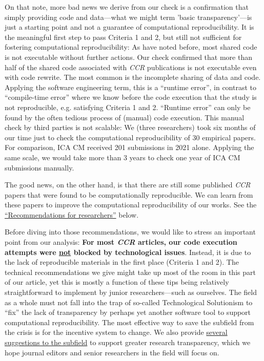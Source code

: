 On that note, more bad news we derive from our check is a confirmation that simply providing code and data---what we might term 'basic transparency'---is just a starting point and not a guarantee of computational reproducibility. It is the meaningful first step to pass Criteria 1 and 2, but still not sufficient for fostering computational reproducibility: As \textcite{cruewell:2023:WB,trisovic:2022} have noted before, most shared code is not executable without further actions. Our check confirmed that more than half of the shared code associated with \textit{CCR} publications is not executable even with code rewrite. The most common is the incomplete sharing of data and code. Applying the software engineering term, this is a ``runtime error'', in contrast to ``compile-time error'' where we know before the code execution that the study is not reproducible, e.g. satisfying Criteria 1 and 2. ``Runtime error'' can only be found by the often tedious process of (manual) code execution. This manual check by third parties is not scalable: We (three researchers) took six months of our time just to check the computational reproducibility of 30 empirical papers. For comparison, ICA CM received 201 submissions in 2021 alone. Applying the same scale, we would take more than 3 years to check one year of ICA CM submissions manually.

The good news, on the other hand, is that there are still some published \textit{CCR} papers that were found to be computationally reproducible. We can learn from these papers to improve the computational reproducibility of our works. See the \hyperref[subsec:recsres]{``Recommendations for researchers''} below. 

Before diving into those recommendations, we would like to stress an important point from our analysis: \textbf{For most \textit{CCR} articles, our code execution attempts were \underline{not} blocked by technological issues}. Instead, it is due to the lack of reproducible materials in the first place (Criteria 1 and 2). The technical recommendations we give might take up most of the room in this part of our article, yet this is mostly a function of these tips being relatively straightforward to implement by junior researchers---such as ourselves. The field as a whole must not fall into the trap of so-called Technological Solutionism to ``fix'' the lack of transparency by perhaps yet another software tool to support computational reproducibility. The most effective way to save the subfield from the crisis is for the incentive system to change. We also provide \hyperref[subsec:recssubfield]{several suggestions to the subfield} to support greater research transparency, which we hope journal editors and senior researchers in the field will focus on.

